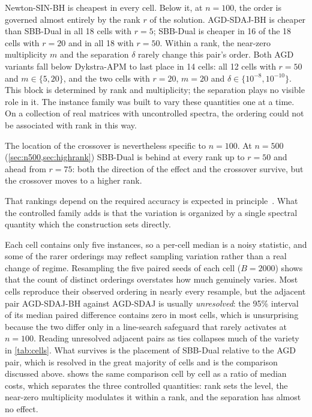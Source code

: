 Newton-SIN-BH is cheapest in every cell. Below it, at $n=100$, the order is
governed almost entirely by the rank $r$ of the solution. AGD-SDAJ-BH is
cheaper than SBB-Dual in all 18 cells with $r=5$; SBB-Dual is cheaper in 16 of
the 18 cells with $r=20$ and in all 18 with $r=50$. Within a rank, the
near-zero multiplicity $m$ and the separation $\delta$ rarely change
this pair's order. Both AGD variants fall below Dykstra-APM to last place in
14 cells: all 12 cells with $r=50$ and $m\in\{5,20\}$, and the two cells with
$r=20$, $m=20$ and $\delta\in\{10^{-8},10^{-10}\}$. This block is determined
by rank and multiplicity; the separation plays no visible role in it. The
instance family was built to vary these quantities one at a time. On a
collection of real matrices with uncontrolled spectra, the ordering could not
be associated with rank in this way.

The location of the crossover is nevertheless specific to $n=100$. At
$n=500$ (\cref{sec:n500,sec:highrank}) SBB-Dual is behind at every rank up to
$r=50$ and ahead from $r=75$: both the direction of the effect and the
crossover survive, but the crossover moves to a higher rank.

That rankings depend on the required accuracy is expected in
principle~\cite{more2009benchmarking,hansen2021coco}. What the controlled
family adds is that the variation is organized by a single spectral quantity
which the construction sets directly.

Each cell contains only five instances, so a per-cell median is a noisy
statistic, and some of the rarer orderings may reflect sampling variation
rather than a real change of regime.
Resampling the five paired seeds of each cell ($B=2000$) shows that the count
of distinct orderings overstates how much genuinely varies. Most cells
reproduce their observed ordering in nearly every resample, but the adjacent
pair AGD-SDAJ-BH against AGD-SDAJ is usually \emph{unresolved}: the 95\%
interval of its median paired difference contains zero in most cells, which is
unsurprising because the two differ only in a line-search safeguard that rarely
activates at $n=100$. Reading unresolved adjacent pairs as ties collapses much
of the variety in \cref{tab:cells}. What survives is the placement of SBB-Dual
relative to the AGD pair, which is resolved in the great majority of cells and
is the comparison discussed above.
 shows the same comparison cell by cell as a ratio of median
costs, which separates the three controlled quantities: rank sets the level,
the near-zero multiplicity modulates it within a rank, and the separation has
almost no effect.


